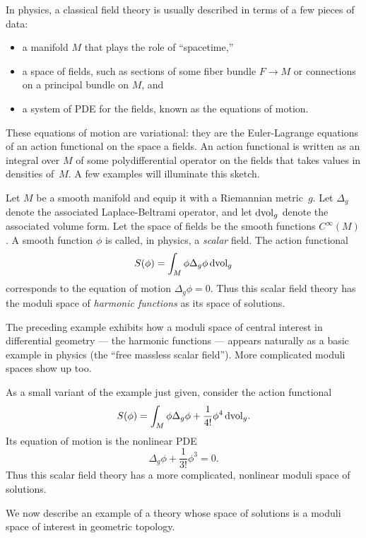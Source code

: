 \documentclass[11pt]{amsart}
\begin{document}
In physics, a classical field theory is usually described in terms of a few pieces of data:
\begin{itemize}
\item a manifold $M$ that plays the role of ``spacetime,''
\item a space of fields, such as sections of some fiber bundle $F \to M$ or connections on a principal bundle on $M$, and
\item a system of PDE for the fields, known as the equations of motion.
\end{itemize}
These equations of motion are variational: 
they are the Euler-Lagrange equations of an action functional on the space a fields.
An action functional is written as an integral over $M$ of some polydifferential operator on the fields that takes values in densities of~$M$.
A few examples will illuminate this sketch.

\begin{eg}
\label{eg: massless scalar}
Let $M$ be a smooth manifold and equip it with a Riemannian metric~$g$.
Let $\Delta_g$ denote the associated Laplace-Beltrami operator, 
and let ${\rm d}{\rm vol}_g$ denote the associated volume form.
Let the space of fields be the smooth functions $C^\infty(M)$.
A smooth function $\phi$ is called, in physics, a {\em scalar} field.
The action functional
\[
S(\phi) = \int_M \phi \Delta_g \phi \, {\rm d}{\rm vol}_g
\]
corresponds to the equation of motion $\Delta_g \phi = 0$. 
Thus this scalar field theory has the moduli space of {\em harmonic functions} as its space of solutions.
\end{eg}

The preceding example exhibits how a moduli space of central interest in differential geometry --- the harmonic functions --- appears naturally as a basic example in physics (the ``free massless scalar field'').
More complicated moduli spaces show up too.

\begin{eg}
As a small variant of the example just given,
consider the action functional
\[
S(\phi) = \int_M \phi \Delta_g \phi + \frac{1}{4!} \phi^4\, {\rm d}{\rm vol}_g.
\]
Its equation of motion is the nonlinear PDE 
\[
\Delta_g \phi + \frac{1}{3!} \phi^3 = 0.
\] 
Thus this scalar field theory has a more complicated, nonlinear moduli space of solutions.
\end{eg}

We now describe an example of a theory whose space of solutions is a moduli space of interest in geometric topology.
\end{document}
